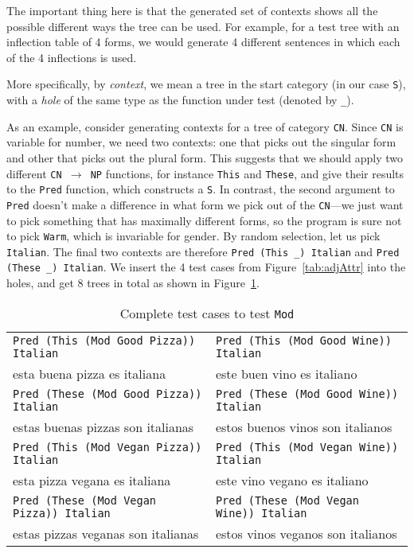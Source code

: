 \documentclass[11pt]{article}
\def\t#1{\texttt{#1}}
\begin{document}
The important thing here is that the generated set of contexts shows
all the possible different ways the tree can be used. For example, for
a test tree with an inflection table of 4 forms, we would generate 4 different sentences in which each of the 4 inflections is used.

More specifically, by \emph{context}, we mean a tree in the start category (in our case \t{S}), with a \emph{hole} of the same type as the function under test (denoted by \verb|_|).

As an example, consider generating contexts for a tree of category \t{CN}.
Since \t{CN} is variable for number, we need two contexts: 
one that picks out the singular form and other that picks out
the plural form. 
This suggests that we should apply two different
\t{CN $\rightarrow$ NP} functions, for instance \t{This} and \t{These}, and
give their results to the \t{Pred} function, which constructs a \t{S}.
In contrast, the second argument to \t{Pred} doesn't make a difference
in what form we pick out of the \t{CN}---we just want to pick
something that has maximally different forms, so the program is sure
not to pick \t{Warm}, which is invariable for gender. By random
selection, let us pick \t{Italian}.
The final two contexts are therefore \verb|Pred (This _) Italian| and \verb|Pred (These _) Italian|.
We insert the 4 test cases from Figure~\ref{tab:adjAttr} into the
holes, and get 8 trees in total as shown in Figure~\ref{tab:testCases}.

\begin{table}
\centering
\begin{tabular}{| l | l |}
\hline
\t{Pred (This (Mod Good Pizza)) Italian} & \t{Pred (This (Mod Good Wine))
                                        Italian} \\ 
esta buena pizza es italiana          & este buen vino es italiano \\ \hline
\t{Pred (These (Mod Good Pizza)) Italian} & \t{Pred (These (Mod Good Wine))
                                        Italian} \\ 
estas buenas pizzas son italianas          & estos buenos vinos son italianos \\ \hline
\t{Pred (This (Mod Vegan Pizza)) Italian} & \t{Pred (This (Mod Vegan Wine))
                                        Italian} \\ 
esta pizza vegana es italiana          & este vino vegano es italiano \\ \hline
\t{Pred (These (Mod Vegan Pizza)) Italian} & \t{Pred (These (Mod Vegan Wine))
                                        Italian} \\ 
estas pizzas veganas son italianas          & estos vinos veganos son italianos \\ \hline
\end{tabular}
\caption{Complete test cases to test \t{Mod}}
\label{tab:testCases}
\end{table}
\end{document}
